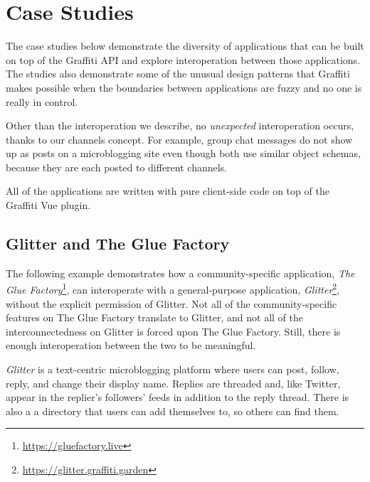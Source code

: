 \section{Case Studies}
\label{case-studies}


The case studies below demonstrate the diversity of applications
that can be built on top of the Graffiti API and explore interoperation
between those applications.
The studies also demonstrate some of the unusual design patterns that
Graffiti makes possible when the boundaries between applications
are fuzzy and no one is really in control.

Other than the interoperation we describe, no \emph{unexpected}
interoperation occurs, thanks to our channels concept.
For example, group chat messages do not show up as posts on
a microblogging site even though both use similar object schemas,
because they are each posted to different channels.

All of the applications are written with pure client-side code on
top of the Graffiti Vue plugin.

\subsection{Glitter and The Glue Factory}

The following example demonstrates how a community-specific application,
\emph{The Glue Factory}\footnote{
\url{https://gluefactory.live}
}, can interoperate with a general-purpose application, \emph{Glitter}\footnote{
\url{https://glitter.graffiti.garden}
},
without the explicit permission of Glitter.
Not all of the community-specific features on The Glue Factory
translate to Glitter, and not all of the interconnectedness on Glitter
is forced upon The Glue Factory.
Still, there is enough interoperation between the two to be meaningful.

\emph{Glitter} is a text-centric microblogging platform
where users can post, follow, reply, and change their display name.
Replies are threaded and, like Twitter, appear in the replier's followers' feeds in addition to the reply thread.
There is also a a directory that users can add themselves to,
so others can find them.

